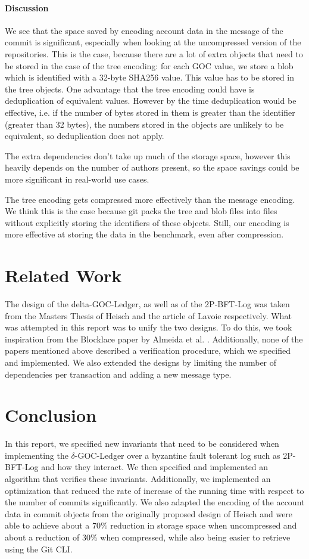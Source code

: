 \subsubsection{Discussion}
We see that the space saved by encoding account data in the message of the commit is significant, especially when looking at the uncompressed version of the repositories.
This is the case, because there are a lot of extra objects that need to be stored in the case of the tree encoding: for each GOC value, we store a blob which is identified with a 32-byte SHA256 value. This value has to be stored in the tree objects. One advantage that the tree encoding could have is deduplication of equivalent values. However by the time deduplication would be effective, i.e. if the number of bytes stored in them is greater than the identifier (greater than 32 bytes), the numbers stored in the objects are unlikely to be equivalent, so deduplication does not apply.

The extra dependencies don't take up much of the storage space, however this heavily depends on the number of authors present, so the space savings could be more significant in real-world use cases.

The tree encoding gets compressed more effectively than the message encoding. We think this is the case because git packs the tree and blob files into files without explicitly storing the identifiers of these objects. Still, our encoding is more effective at storing the data in the benchmark, even after compression.

\chapter{Related Work}
The design of the delta-GOC-Ledger, as well as of the 2P-BFT-Log was taken from the Masters Thesis of Heisch \cite{delta-goc-ledger-heisch} and the article of Lavoie \cite{2p-bft-log} respectively. What was attempted in this report was to unify the two designs. To do this, we took inspiration from the Blocklace paper by Almeida et al. \cite{blocklace-crdt}. Additionally, none of the papers mentioned above described a verification procedure, which we specified and implemented. We also extended the designs by limiting the number of dependencies per transaction and adding a new message type.

\chapter{Conclusion}
In this report, we specified new invariants that need to be considered when implementing the $\delta$-GOC-Ledger over a byzantine fault tolerant log such as 2P-BFT-Log and how they interact. We then specified and implemented an algorithm that verifies these invariants. Additionally, we implemented an optimization that reduced the rate of increase of the running time with respect to the number of commits significantly. We also adapted the encoding of the account data in commit objects from the originally proposed design of Heisch and were able to achieve about a 70\% reduction in storage space when uncompressed and about a reduction of 30\% when compressed, while also being easier to retrieve using the Git CLI.

